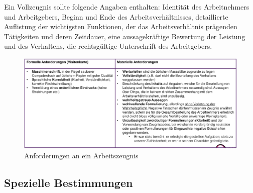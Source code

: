 Ein Vollzeugnis sollte folgende Angaben enthalten: Identität des Arbeitnehmers und Arbeitgebers, Beginn und Ende des Arbeitsverhältnisses, detaillierte Auflistung der wichtigsten Funktionen, der das Arbeitsverhältnis prägenden Tätigkeiten und deren Zeitdauer, eine aussagekräftige Bewertung der Leistung und des Verhaltens, die rechtsgültige Unterschrift des Arbeitgebers.

\begin{figure}[H]
  \centering
  \includegraphics*[width=\linewidth]{res/arbeitsrecht-arbeitszeugnis.png}
  \caption{Anforderungen an ein Arbeitszeugnis}
\end{figure}

\newpage
\subsection{Spezielle Bestimmungen}

